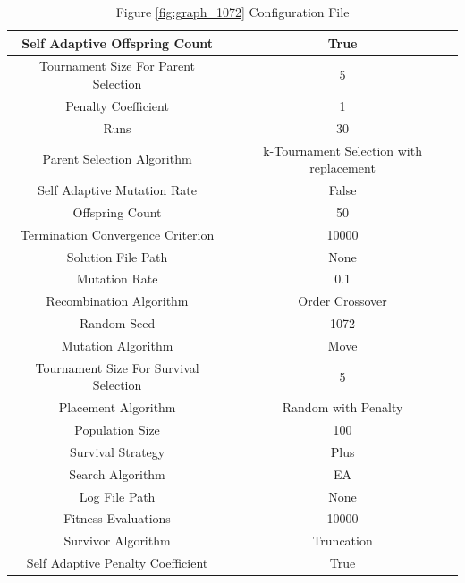 \documentclass{standalone}
\begin{document}
\begin{table}[!htb]
	\centering
	\caption{Figure \ref{fig:graph_1072} Configuration File}
	\label{tab:graph_1072}
	\begin{tabular}{| c | c |}
		\hline
		Self Adaptive Offspring Count		& True		 \\
		\hline
		Tournament Size For Parent Selection		& 5		 \\
		\hline
		Penalty Coefficient		& 1		 \\
		\hline
		Runs		& 30		 \\
		\hline
		Parent Selection Algorithm		& k-Tournament Selection with replacement		 \\
		\hline
		Self Adaptive Mutation Rate		& False		 \\
		\hline
		Offspring Count		& 50		 \\
		\hline
		Termination Convergence Criterion		& 10000		 \\
		\hline
		Solution File Path		& None		 \\
		\hline
		Mutation Rate		& 0.1		 \\
		\hline
		Recombination Algorithm		& Order Crossover		 \\
		\hline
		Random Seed		& 1072		 \\
		\hline
		Mutation Algorithm		& Move		 \\
		\hline
		Tournament Size For Survival Selection		& 5		 \\
		\hline
		Placement Algorithm		& Random with Penalty		 \\
		\hline
		Population Size		& 100		 \\
		\hline
		Survival Strategy		& Plus		 \\
		\hline
		Search Algorithm		& EA		 \\
		\hline
		Log File Path		& None		 \\
		\hline
		Fitness Evaluations		& 10000		 \\
		\hline
		Survivor Algorithm		& Truncation		 \\
		\hline
		Self Adaptive Penalty Coefficient		& True		 \\
		\hline
	\end{tabular}
\end{table}
\end{document}

